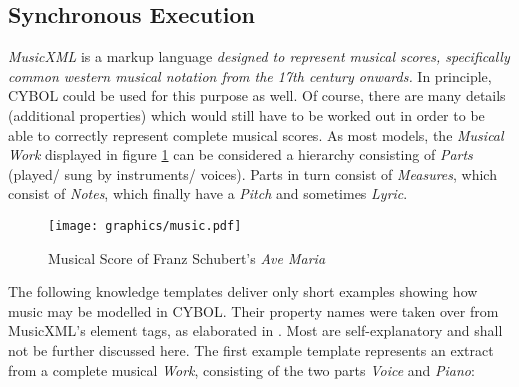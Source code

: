 %
%
%
%
%
%

\subsection{Synchronous Execution}
\label{synchronous_execution_heading}

\emph{MusicXML} \cite{musicxml} is a markup language \textit{designed to
represent musical scores, specifically common western musical notation from the
17th century onwards.} In principle, CYBOL could be used for this purpose as
well. Of course, there are many details (additional properties) which would
still have to be worked out in order to be able to correctly represent complete
musical scores. As most models, the \emph{Musical Work} displayed in figure
\ref{music_figure} can be considered a hierarchy consisting of \emph{Parts}
(played/ sung by instruments/ voices). Parts in turn consist of
\emph{Measures}, which consist of \emph{Notes}, which finally have a
\emph{Pitch} and sometimes \emph{Lyric}.

\begin{figure}[ht]
    \begin{center}
        \texttt{[image: graphics/music.pdf]}
        \caption{Musical Score of Franz Schubert's \emph{Ave Maria} \cite{musicxml}}
        \label{music_figure}
    \end{center}
\end{figure}

The following knowledge templates deliver only short examples showing how music
may be modelled in CYBOL. Their property names were taken over from MusicXML's
element tags, as elaborated in \cite{musicxml}. Most are self-explanatory and
shall not be further discussed here. The first example template represents an
extract from a complete musical \emph{Work}, consisting of the two parts
\emph{Voice} and \emph{Piano}:

